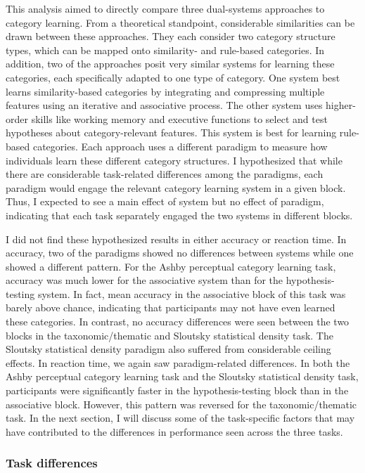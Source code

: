 \documentclass[../dissertation.tex]{subfiles}
\begin{document}
This analysis aimed to directly compare three dual-systems approaches to category learning. From a theoretical standpoint, considerable similarities can be drawn between these approaches. They each consider two category structure types, which can be mapped onto similarity- and rule-based categories. In addition, two of the approaches posit very similar systems for learning these categories, each specifically adapted to one type of category. One system best learns similarity-based categories by integrating and compressing multiple features using an iterative and associative process. The other system uses higher-order skills like working memory and executive functions to select and test hypotheses about category-relevant features. This system is best for learning rule-based categories. Each approach uses a different paradigm to measure how individuals learn these different category structures. I hypothesized that while there are considerable task-related differences among the paradigms, each paradigm would engage the relevant category learning system in a given block. Thus, I expected to see a main effect of system but no effect of paradigm, indicating that each task separately engaged the two systems in different blocks. \par
	I did not find these hypothesized results in either accuracy or reaction time. In accuracy, two of the paradigms showed no differences between systems while one showed a different pattern. For the Ashby perceptual category learning task, accuracy was much lower for the associative system than for the hypothesis-testing system. In fact, mean accuracy in the associative block of this task was barely above chance, indicating that participants may not have even learned these categories. In contrast, no accuracy differences were seen between the two blocks in the taxonomic/thematic and Sloutsky statistical density task. The Sloutsky statistical density paradigm also suffered from considerable ceiling effects. In reaction time, we again saw paradigm-related differences. In both the Ashby perceptual category learning task and the Sloutsky statistical density task, participants were significantly faster in the hypothesis-testing block than in the associative block. However, this pattern was reversed for the taxonomic/thematic task. In the next section, I will discuss some of the task-specific factors that may have contributed to the differences in performance seen across the three tasks. \par
	
\subsubsection{Task differences}
\end{document}
